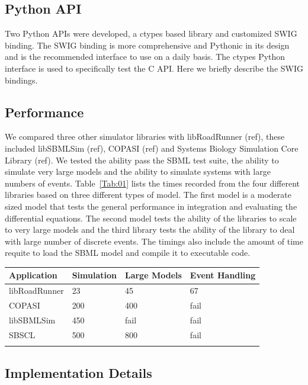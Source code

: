 \documentclass{bioinfo}
\begin{document}
\begin{methods}
\subsection{Python API}

Two Python APIs were developed, a ctypes based library and customized SWIG binding. The SWIG binding is more comprehensive and Pythonic in its design and is the recommended interface to use on a daily basis. The ctypes Python interface is used to specifically test the C API. Here we briefly describe the SWIG bindings.

\subsection{Performance}

We compared three other simulator libraries with libRoadRunner (ref), these included libSBMLSim (ref), COPASI (ref) and Systems Biology Simulation Core Library (ref). We tested the ability pass the SBML test suite, the ability to simulate very large models and the ability to simulate systems with large numbers of events. Table~\ref{Tab:01} lists the times recorded from the four different libraries based on three different types of model. The first model is a moderate sized model that tests the general performance in integration and evaluating the differential equations. The second model tests the ability of the libraries to scale to very large models and the third library tests the ability of the library to deal with large number of discrete events. The timings also include the amount of time requite to load the SBML model and compile it to executable code.
%
\begin{table}[!t]
{\begin{tabular}{llll}\toprule
Application & Simulation & Large Models & Event Handling\\\midrule
libRoadRunner & 23 & 45 & 67  \\
COPASI & 200 & 400 & fail\\
libSBMLSim & 450 & fail & fail\\
SBSCL & 500 & 800 & fail \\ \botrule
\end{tabular}}{}
\end{table}

\subsection*{Implementation Details}


\end{methods}
\end{document}

